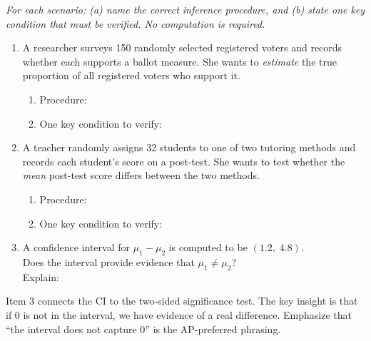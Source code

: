 \documentclass[10pt]{article}
\begin{document}
\namedateperiod

\vspace{0.15in}

\textit{For each scenario: (a) name the correct inference procedure, and (b) state one key
condition that must be verified. No computation is required.}

\vspace{0.10in}
\begin{enumerate}

\item A researcher surveys 150 randomly selected registered voters and records whether each
      supports a ballot measure. She wants to \emph{estimate} the true proportion of all
      registered voters who support it.

      \begin{enumerate}[label=\alph*.]
        \item Procedure: 
        \item One key condition to verify: 
      \end{enumerate}

\vspace{0.12in}

\item A teacher randomly assigns 32 students to one of two tutoring methods and records each
      student's score on a post-test. She wants to test whether the \emph{mean} post-test score
      differs between the two methods.

      \begin{enumerate}[label=\alph*.]
        \item Procedure: 
        \item One key condition to verify: 
      \end{enumerate}

\vspace{0.12in}

\item A confidence interval for $\mu_1 - \mu_2$ is computed to be $(1.2,\; 4.8)$.\\
      Does the interval provide evidence that $\mu_1 \ne \mu_2$? \\
      Explain: 

\end{enumerate}

\begin{teachernote}
Item 3 connects the CI to the two-sided significance test. The key insight is that if 0 is
not in the interval, we have evidence of a real difference. Emphasize that ``the interval
does not capture 0'' is the AP-preferred phrasing.
\end{teachernote}
\end{document}

